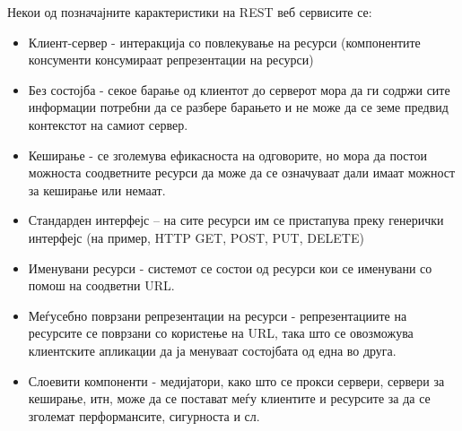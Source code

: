 Некои од позначајните карактеристики на REST веб сервисите се: 
\begin{itemize}
  \item Клиент-сервер - интеракција со повлекување на ресурси (компонентите консументи
консумираат репрезентации на ресурси)
\item Без состојба - секое барање од клиентот до серверот мора да ги содржи сите информации потребни да се разбере
барањето и не може да се земе предвид контекстот на самиот сервер.
\item Кеширање - се зголемува ефикасноста на одговорите, но мора да постои
можноста соодветните ресурси да може да се означуваат дали имаат можност за кеширање или немаат.
\item Стандарден интерфејс – на сите ресурси им се пристапува преку генерички
интерфејс (на пример, HTTP GET, POST, PUT, DELETE)
\item Именувани ресурси - системот
се состои од ресурси кои се именувани со помош на соодветни URL.
\item  Меѓусебно
поврзани репрезентации на ресурси - репрезентациите на ресурсите се поврзани со
користење на URL, така што се овозможува клиентските апликации да ја менуваат
состојбата од една во друга.
\item Слоевити компоненти - медијатори, како што се
прокси сервери, сервери за кеширање, итн, може да се постават меѓу клиентите и
ресурсите за да се зголемат перформансите, сигурноста и сл.
\end{itemize}


